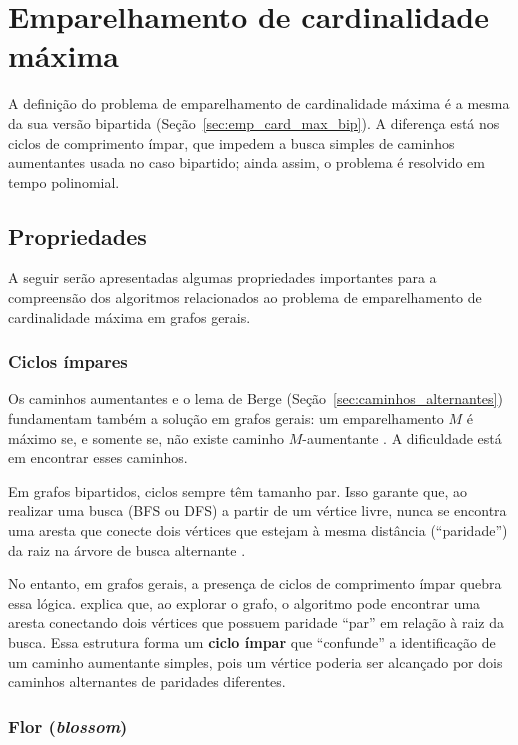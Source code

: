 \section{Emparelhamento de cardinalidade máxima}
\label{sec:emp_card_max_geral}

A definição do problema de emparelhamento de cardinalidade máxima é a mesma da sua versão bipartida (Seção~\ref{sec:emp_card_max_bip}). A diferença está nos ciclos de comprimento ímpar, que impedem a busca simples de caminhos aumentantes usada no caso bipartido; ainda assim, o problema é resolvido em tempo polinomial.

\subsection{Propriedades}

A seguir serão apresentadas algumas propriedades importantes para a compreensão dos algoritmos relacionados ao problema de emparelhamento de cardinalidade máxima em grafos gerais.

\subsubsection{Ciclos ímpares}

Os caminhos aumentantes e o lema de Berge (Seção~\ref{sec:caminhos_alternantes}) fundamentam também a solução em grafos gerais: um emparelhamento $M$ é máximo se, e somente se, não existe caminho $M$-aumentante \cite{jungnickel}. A dificuldade está em encontrar esses caminhos.

Em grafos bipartidos, ciclos sempre têm tamanho par. Isso garante que, ao realizar uma busca (BFS ou DFS) a partir de um vértice livre, nunca se encontra uma aresta que conecte dois vértices que estejam à mesma distância (``paridade'') da raiz na árvore de busca alternante \cite{ahuja}.

No entanto, em grafos gerais, a presença de ciclos de comprimento ímpar quebra essa lógica.  explica que, ao explorar o grafo, o algoritmo pode encontrar uma aresta conectando dois vértices que possuem paridade ``par'' em relação à raiz da busca. Essa estrutura forma um \textbf{ciclo ímpar} que ``confunde'' a identificação de um caminho aumentante simples, pois um vértice poderia ser alcançado por dois caminhos alternantes de paridades diferentes.

\subsubsection{Flor (\textit{blossom})}

